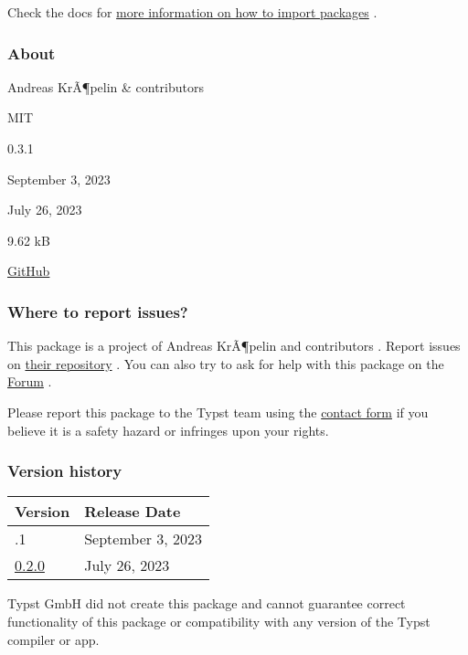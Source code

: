 

Check the docs for
\href{https://typst.app/docs/reference/scripting/\#packages}{more
information on how to import packages} .

\subsubsection{About}\label{about}

\begin{description}
\tightlist
\item[Author s :]
Andreas KrÃ¶pelin \& contributors
\item[License:]
MIT
\item[Current version:]
0.3.1
\item[Last updated:]
September 3, 2023
\item[First released:]
July 26, 2023
\item[Archive size:]
9.62 kB
\href{https://packages.typst.org/preview/polylux-0.3.1.tar.gz}{\pandocbounded{}}
\item[Repository:]
\href{https://github.com/andreasKroepelin/polylux}{GitHub}
\end{description}

\subsubsection{Where to report issues?}\label{where-to-report-issues}

This package is a project of Andreas KrÃ¶pelin and contributors . Report
issues on \href{https://github.com/andreasKroepelin/polylux}{their
repository} . You can also try to ask for help with this package on the
\href{https://forum.typst.app}{Forum} .

Please report this package to the Typst team using the
\href{https://typst.app/contact}{contact form} if you believe it is a
safety hazard or infringes upon your rights.

\label{versions}
\subsubsection{Version history}\label{version-history}

\begin{longtable}[]{@{}ll@{}}
\toprule\noalign{}
Version & Release Date \\
\midrule\noalign{}
\endhead
\bottomrule\noalign{}
\endlastfoot
0.3.1 & September 3, 2023 \\
\href{https://typst.app/universe/package/polylux/0.2.0/}{0.2.0} & July
26, 2023 \\
\end{longtable}

Typst GmbH did not create this package and cannot guarantee correct
functionality of this package or compatibility with any version of the
Typst compiler or app.
